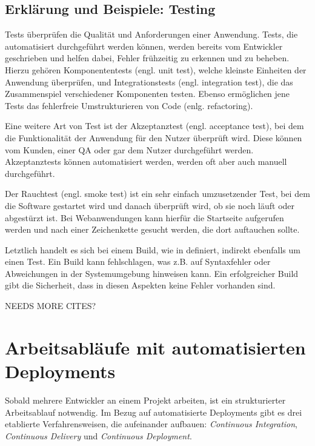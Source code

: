 \subsection{Erklärung und Beispiele: Testing}
\label{subsec:def-testing}

Tests überprüfen die Qualität und Anforderungen einer Anwendung. Tests, die automatisiert durchgeführt werden können, werden bereits vom Entwickler geschrieben und helfen dabei, Fehler frühzeitig zu erkennen und zu beheben. Hierzu gehören Komponententests (engl. unit test), welche kleinste Einheiten der Anwendung überprüfen, und Integrationstests (engl. integration test), die das Zusammenspiel verschiedener Komponenten testen. Ebenso ermöglichen jene Tests das fehlerfreie Umstrukturieren von Code (enlg. refactoring). \citep[104f]{Wolff2016}

Eine weitere Art von Test ist der Akzeptanztest (engl. acceptance test), bei dem die Funktionalität der Anwendung für den Nutzer überprüft wird. Diese können vom Kunden, einer \ac{QA} oder gar dem Nutzer durchgeführt werden. Akzeptanztests können automatisiert werden, werden oft aber auch manuell durchgeführt.

Der Rauchtest (engl. smoke test) ist ein sehr einfach umzusetzender Test, bei dem die Software gestartet wird und danach überprüft wird, ob sie noch läuft oder abgestürzt ist. Bei Webanwendungen kann hierfür die Startseite aufgerufen werden und nach einer Zeichenkette gesucht werden, die dort auftauchen sollte.

Letztlich handelt es sich bei einem Build, wie in  definiert, indirekt ebenfalls um einen Test. Ein Build kann fehlschlagen, was z.B. auf Syntaxfehler oder Abweichungen in der Systemumgebung hinweisen kann. Ein erfolgreicher Build gibt die Sicherheit, dass in diesen Aspekten keine Fehler vorhanden sind.

{\draft NEEDS MORE CITES?}

\section{Arbeitsabläufe mit automatisierten Deployments}

Sobald mehrere Entwickler an einem Projekt arbeiten, ist ein strukturierter Arbeitsablauf notwendig. Im Bezug auf automatisierte Deployments gibt es drei etablierte Verfahrensweisen, die aufeinander aufbauen: \emph{Continuous Integration}, \emph{Continuous Delivery} und \emph{Continuous Deployment}.

